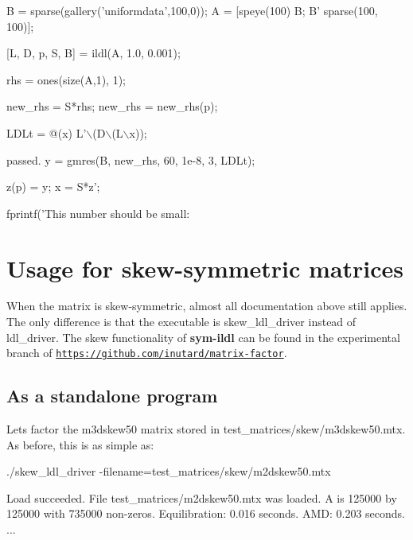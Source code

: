 \begin{DoxyParagraph}{}

\begin{DoxyCode}
B = sparse(gallery(\textcolor{stringliteral}{'uniformdata'},100,0));
A = [speye(100) B; B' sparse(100, 100)];

[L, D, p, S, B] = ildl(A, 1.0, 0.001);

rhs = ones(size(A,1), 1);

new\_rhs = S*rhs;
new\_rhs = new\_rhs(p);

LDLt = @(x) L'\(\backslash\)(D\(\backslash\)(L\(\backslash\)x));

      passed.
y = gmres(B, new\_rhs, 60, 1e-8, 3, LDLt);

z(p) = y;
x = S*z';

fprintf('This number should be small: %
\end{DoxyCode}

\end{DoxyParagraph}
\hypertarget{index_skew_usage}{}\section{Usage for skew-\/symmetric matrices}\label{index_skew_usage}
When the matrix is skew-\/symmetric, almost all documentation above still applies. The only difference is that the executable is {\ttfamily skew\+\_\+ldl\+\_\+driver} instead of {\ttfamily ldl\+\_\+driver}. The skew functionality of {\bfseries sym-\/ildl} can be found in the experimental branch of \href{https://github.com/inutard/matrix-factor}{\tt https\+://github.\+com/inutard/matrix-\/factor}.\hypertarget{index_skew_ldl_driver}{}\subsection{As a standalone program}\label{index_skew_ldl_driver}
Let\textquotesingle{}s factor the {\ttfamily m3dskew50} matrix stored in {\ttfamily test\+\_\+matrices/skew/m3dskew50.\+mtx}. As before, this is as simple as\+: \begin{DoxyParagraph}{}

\begin{DoxyCode}
./skew\_ldl\_driver -filename=test\_matrices/skew/m2dskew50.mtx

Load succeeded. File test\_matrices/m2dskew50.mtx was loaded.
A is 125000 by 125000 with 735000 non-zeros.
Equilibration:  0.016 seconds.
AMD:            0.203 seconds.
...
\end{DoxyCode}

\end{DoxyParagraph}
